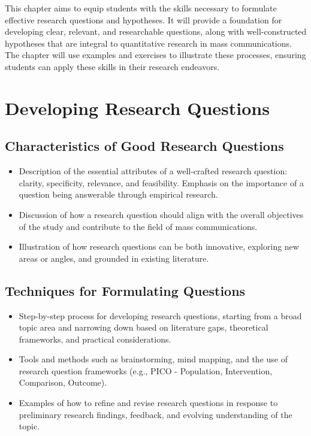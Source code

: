 \documentclass[
]{book}
\begin{document}
This chapter aims to equip students with the skills necessary to formulate effective research questions and hypotheses. It will provide a foundation for developing clear, relevant, and researchable questions, along with well-constructed hypotheses that are integral to quantitative research in mass communications. The chapter will use examples and exercises to illustrate these processes, ensuring students can apply these skills in their research endeavors.

\hypertarget{developing-research-questions}{%
\section*{Developing Research Questions}\label{developing-research-questions}}

\hypertarget{characteristics-of-good-research-questions}{%
\subsection*{Characteristics of Good Research Questions}\label{characteristics-of-good-research-questions}}

\begin{itemize}
\item
  Description of the essential attributes of a well-crafted research question: clarity, specificity, relevance, and feasibility. Emphasis on the importance of a question being answerable through empirical research.
\item
  Discussion of how a research question should align with the overall objectives of the study and contribute to the field of mass communications.
\item
  Illustration of how research questions can be both innovative, exploring new areas or angles, and grounded in existing literature.
\end{itemize}

\hypertarget{techniques-for-formulating-questions}{%
\subsection*{Techniques for Formulating Questions}\label{techniques-for-formulating-questions}}

\begin{itemize}
\item
  Step-by-step process for developing research questions, starting from a broad topic area and narrowing down based on literature gaps, theoretical frameworks, and practical considerations.
\item
  Tools and methods such as brainstorming, mind mapping, and the use of research question frameworks (e.g., PICO - Population, Intervention, Comparison, Outcome).
\item
  Examples of how to refine and revise research questions in response to preliminary research findings, feedback, and evolving understanding of the topic.
\end{itemize}
\end{document}
